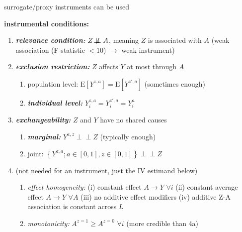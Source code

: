 \documentclass[8pt,twoside]{extarticle}
\newcommand{\indep}{\perp \!\!\! \perp}
\begin{document}
\begin{multicols}{2}
 surrogate/proxy instruments can be used

 \textbf{instrumental conditions:} 
\begin{enumerate}[itemsep=0em, topsep=0pt, partopsep=0pt,parsep=0pt, leftmargin=1.5em]
\setlength{\itemsep}{0pt}%
\setlength{\parskip}{0pt}
\item \textbf{\textit{relevance condition:}} $Z \not\!\indep A$, meaning $Z$ is associated with $A$ \newline (weak association (F-statistic $< 10$) $\rightarrow$ weak instrument)
\item \textbf{\textit{exclusion restriction:}} $Z$ affects $Y$ at most through $A$
\begin{enumerate}[itemsep=0em, topsep=0pt, partopsep=0pt,parsep=0pt, leftmargin=1.5em]
\setlength{\itemsep}{0pt}%
\setlength{\parskip}{0pt}
\item population level: $\mathrm{E}\left[Y^{z,a}\right] = \mathrm{E}\left[Y^{z',a}\right]$ (sometimes enough)
\item \textbf{\textit{individual level:}} $Y^{z,a}_i =  Y^{z',a}_i = Y^{a}_i$
\end{enumerate}
\item \textbf{\textit{exchangeability:}} $Z$ and $Y$ have no shared causes
\begin{enumerate}[itemsep=0em, topsep=0pt, partopsep=0pt,parsep=0pt, leftmargin=1.5em]
\setlength{\itemsep}{0pt}%
\setlength{\parskip}{0pt}
\item \textbf{\textit{marginal:}} $Y^{a,z} \indep Z$ (typically enough)
\item joint: $\left\{Y^{z, a};a\in\left[0,1\right],z\in\left[0,1\right]\right\} \indep Z$
\end{enumerate}
\item  (not needed for an instrument, just the IV estimand below)
\begin{enumerate}[itemsep=0em, topsep=0pt, partopsep=0pt,parsep=0pt, leftmargin=1.5em]
\setlength{\itemsep}{0pt}%
\setlength{\parskip}{0pt}
\item \textit{effect homogeneity:} (i) constant effect $A\rightarrow Y \,\, \forall i$ (ii) constant average effect $A\rightarrow Y \,\, \forall A$ (iii) no additive effect modifiers (iv) additive Z-A association is constant across $L$
\item \textit{monotonicity:} $A^{z=1} \geq A^{z=0} \,\, \forall i$ (more credible than 4a)
\end{enumerate}
\end{enumerate}


\end{multicols}
\end{document}
